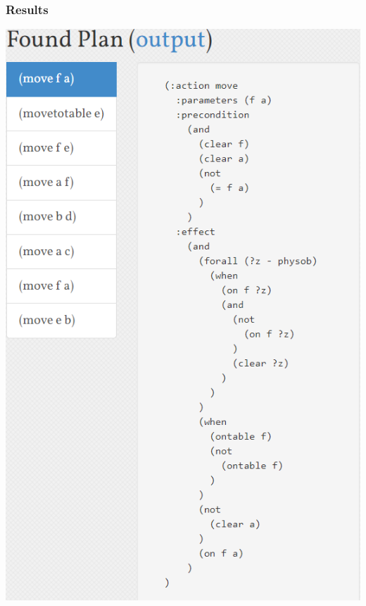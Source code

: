 ﻿\documentclass[a4paper, 11pt]{article}
\begin{document}
\subsubsection{Results}
\includegraphics[width=14cm]{result2.png}

%
%
\end{document}

